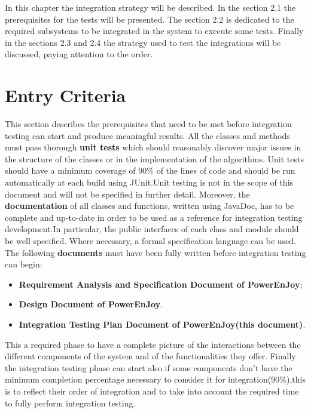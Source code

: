 In this chapter the integration strategy will be described. In the section 2.1
the prerequisites for the tests will be presented. The section 2.2 is dedicated to
the required subsystems to be integrated in the system to execute some tests.
Finally in the sections 2.3 and 2.4 the strategy used to test the integrations will
be discussed, paying attention to the order.
\section{Entry Criteria}
This section describes the prerequisites that need to be met before integration
testing can start and produce meaningful results.
All the classes and methods must pass thorough \textbf{unit tests } which should
reasonably discover major issues in the structure of the classes or in the implementation
of the algorithms. Unit tests should have a minimum coverage
of 90\% of the lines of code and should be run automatically at each build
using JUnit.Unit testing is not in the scope of this document and will not
be specified in further detail.
Moreover, the \textbf{documentation} of all classes and functions, written using
JavaDoc, has to be complete and up-to-date in order to be used as a reference
for integration testing development.In particular, the public interfaces of
each class and module should be well specified. Where necessary, a formal
specification language can be used.
The following \textbf{documents} must have been fully written before integration testing can
begin:

\begin{itemize}
\item \textbf{Requirement Analysis and Specification Document of PowerEnJoy};
\item \textbf{Design Document of PowerEnJoy}.
\item \textbf{Integration Testing Plan Document of PowerEnJoy(this document)}.
\end{itemize}

This a required phase to have a complete picture of the interactions between the different components of the system and of the functionalities they offer.
Finally the integration testing phase can start also if some components don't have the minimum completion percentage necessary to consider it for integration(90\%),this is to reflect their order of integration and to take into account the required time to fully perform integration testing.

